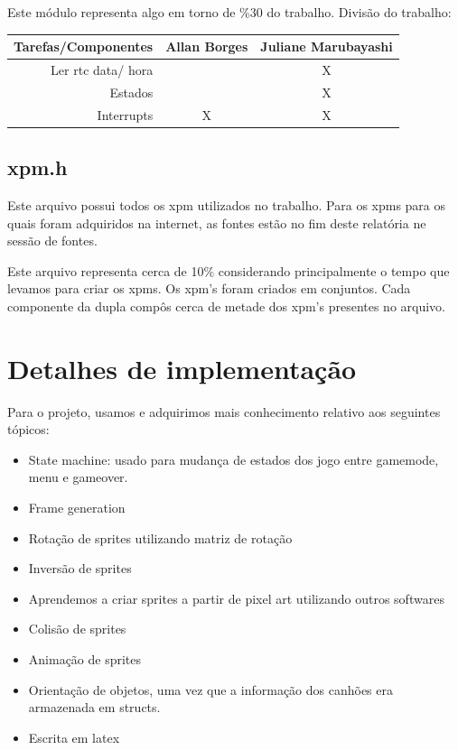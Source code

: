 \documentclass[12pt]{article}
\begin{document}
Este módulo representa algo em torno de \%30 do trabalho. \newline
Divisão do trabalho: \newline 
\begin{center}
    \begin{tabular}{|r|c|c|}
        \hline
        \textbf{Tarefas/Componentes} & \textbf{Allan Borges} & \textbf{Juliane Marubayashi} \\ 
        \hline
        Ler rtc data/ hora & & X \\ 
        Estados & & X \\ 
        Interrupts& X & X \\ 
        \hline
    \end{tabular}
\end{center}

\subsection{xpm.h}
Este arquivo possui todos os xpm utilizados no trabalho. \newline
Para os xpms para os quais foram adquiridos na internet, as fontes estão
no fim deste relatória ne sessão de fontes. 

Este arquivo representa cerca de 10\% considerando principalmente o tempo que levamos para
criar os xpms. \newline
Os xpm's foram criados em conjuntos. Cada componente da dupla compôs cerca de metade dos xpm's
presentes no arquivo. 
\section{Detalhes de implementação}

Para o projeto, usamos e adquirimos mais conhecimento relativo aos seguintes tópicos: 
\begin{itemize}
    \item State machine: usado para mudança de estados dos jogo entre gamemode, menu e gameover. 
    \item Frame generation 
    \item Rotação de sprites utilizando matriz de rotação 
    \item Inversão de sprites 
    \item Aprendemos a criar sprites a partir de pixel art utilizando outros softwares
    \item Colisão de sprites
    \item Animação de sprites 
    \item Orientação de objetos, uma vez que a informação dos canhões era armazenada em structs. 
    \item Escrita em latex
\end{itemize}
\end{document}
